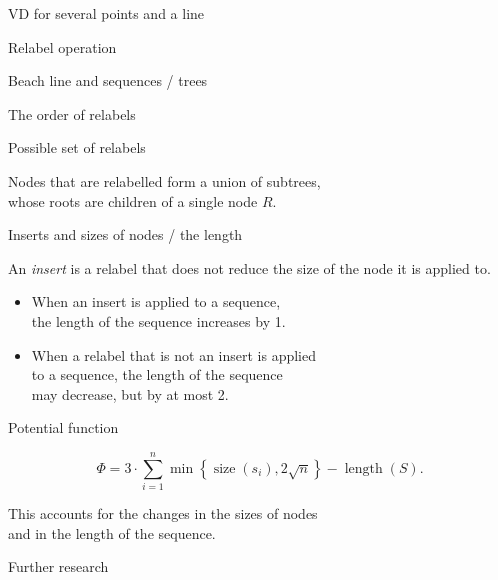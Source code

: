 \documentclass[17pt]{extarticle}
\newcommand{\newslide}[1]{\newpage \begin{center} \large #1 \end{center}}
\DeclareMathOperator{\size}{size}
\DeclareMathOperator{\length}{length}
\begin{document}
\newslide{VD for several points and a line}

\newslide{Relabel operation}

\newslide{Beach line and sequences / trees}

\newslide{The order of relabels}



\newslide{Possible set of relabels} \vspace{-15mm}

 \vspace{-2mm}

Nodes that are relabelled form a union of subtrees, \\
whose roots are children of a single node \(R\).

\newslide{Inserts and sizes of nodes / the length} \vspace{-6mm}

	An {\it insert} is a relabel that does not reduce the size of the node it is applied to. \vspace{-3mm}

\begin{itemize}
	\item When an insert is applied to a sequence, \\
	   the length of the sequence increases by 1.
	\item When a relabel that is not an insert is applied \\
	   to a sequence, the length of the sequence \\
	   may decrease, but by at most 2.
\end{itemize}

\newslide{Potential function}
   \[
	Φ = 3 \cdot \sum\limits_{i=1}^n
	\min\left\{ \size(s_i), 2 \sqrt{n} \right\}
	- \length (S).
   \]

This accounts for the changes in the sizes of nodes \\
and in the length of the sequence.

\newslide{Further research}
\end{document}
